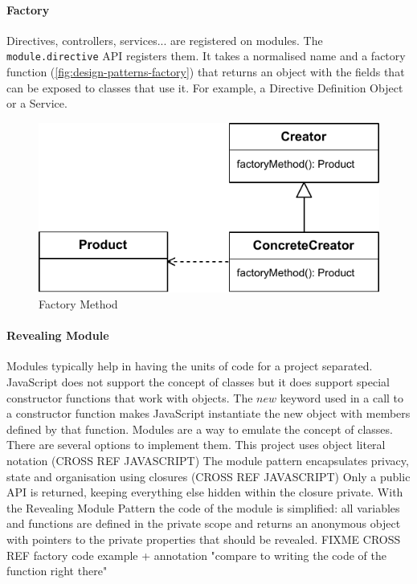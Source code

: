 \paragraph{Factory} Directives, controllers, services... are registered on modules. 
The \texttt{module.directive} \ac{API} registers them. 
It takes a normalised name and a factory function (\ref{fig:design-patterns-factory}) that returns an object with the fields that can be exposed to classes that use it.
For example, a Directive Definition Object or a Service.

\begin{figure}[htb]
    \centering
    \includegraphics{figures/design-patterns-factory.pdf}
    \caption{Factory Method}
    \label{fig:design-patterns-factory0}
\end{figure}


\paragraph{Revealing Module} \cite{Osmani:2012} Modules typically help in having the units of code for a project separated.
JavaScript does not support the concept of classes but it does support special constructor functions that work with objects. 
The $new$ keyword used in a call to a constructor function makes JavaScript instantiate the new object with members defined by that function.
Modules are a way to emulate the concept of classes.
There are several options to implement them. 
This project uses object literal notation (CROSS REF JAVASCRIPT)
The module pattern encapsulates privacy, state and organisation using closures (CROSS REF JAVASCRIPT)
Only a public \ac{API} is returned, keeping everything else hidden within the closure private.
With the Revealing Module Pattern the code of the module is simplified: all variables and functions are defined in the private scope and returns an anonymous object with pointers to the private properties that should be revealed.
FIXME CROSS REF factory code example  + annotation "compare to writing the code of the function right there"

